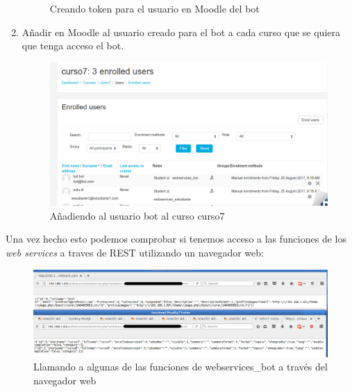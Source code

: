 \begin{enumerate}
\begin{figure}[H]
\caption{Creando token para el usuario en Moodle del bot }\label{figura419}
\end{figure}
\item Añadir en Moodle al usuario creado para el bot a cada curso que se quiera que tenga acceso el bot.

\begin{figure}[H] %
\centering
\includegraphics[scale=0.3]{imagenes/moodle/Screenshot_2017-08-25_12-19-29.png}  %

\caption{Añadiendo al usuario bot al curso curso7 }\label{figura420}
\end{figure}
\end{enumerate}



Una vez hecho esto podemos comprobar si tenemos acceso a las funciones de los \textit{web services} a traves de REST utilizando un navegador web:
\begin{figure}[H] %
\centering
\includegraphics[scale=0.35]{imagenes/moodle/Screenshot_2017-08-25_12-32-18.png}  %

\caption{Llamando a algunas de las funciones de webservices\_bot a través del navegador web }\label{figura420}
\end{figure}

